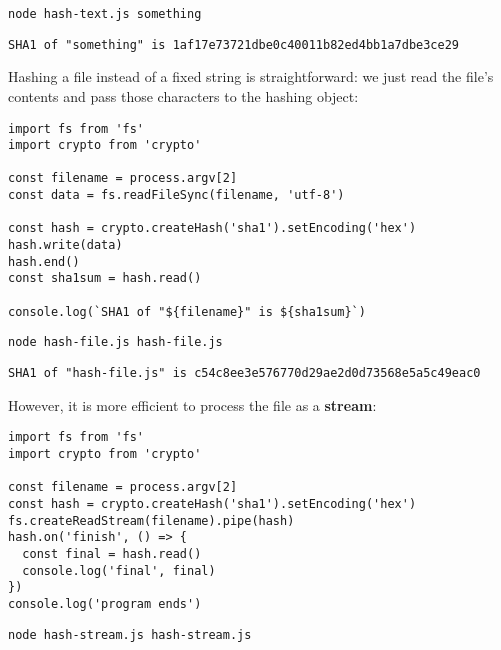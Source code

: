 \documentclass[krantzl]{krantz}
\newcommand{\glossref}[1]{\textbf{#1}}
\begin{document}
\begin{lstlisting}[frame=shadowbox]
node hash-text.js something
\end{lstlisting}



\begin{lstlisting}[frame=tblr,backgroundcolor=\color{black!5}]
SHA1 of "something" is 1af17e73721dbe0c40011b82ed4bb1a7dbe3ce29
\end{lstlisting}



Hashing a file instead of a fixed string is straightforward:
we just read the file’s contents and pass those characters to the hashing object:


\begin{lstlisting}[frame=tblr]
import fs from 'fs'
import crypto from 'crypto'

const filename = process.argv[2]
const data = fs.readFileSync(filename, 'utf-8')

const hash = crypto.createHash('sha1').setEncoding('hex')
hash.write(data)
hash.end()
const sha1sum = hash.read()

console.log(`SHA1 of "${filename}" is ${sha1sum}`)
\end{lstlisting}



\begin{lstlisting}[frame=shadowbox]
node hash-file.js hash-file.js
\end{lstlisting}



\begin{lstlisting}[frame=tblr,backgroundcolor=\color{black!5}]
SHA1 of "hash-file.js" is c54c8ee3e576770d29ae2d0d73568e5a5c49eac0
\end{lstlisting}



However,
it is more efficient to process the file as a \glossref{stream}:


\begin{lstlisting}[frame=tblr]
import fs from 'fs'
import crypto from 'crypto'

const filename = process.argv[2]
const hash = crypto.createHash('sha1').setEncoding('hex')
fs.createReadStream(filename).pipe(hash)
hash.on('finish', () => {
  const final = hash.read()
  console.log('final', final)
})
console.log('program ends')
\end{lstlisting}



\begin{lstlisting}[frame=shadowbox]
node hash-stream.js hash-stream.js
\end{lstlisting}
\end{document}
